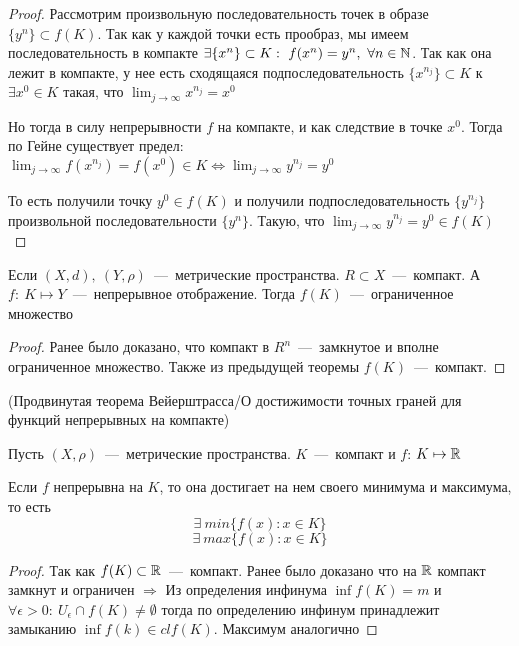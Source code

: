 \begin{proof}
    Рассмотрим произвольную последовательность точек в образе $\{y^n\} \subset f(K) $. Так как у каждой точки есть прообраз, мы имеем последовательность в компакте $\exists \{ x^n \} \subset K: \ f(x^n) = y^n, \  \forall n \in \N$. Так как она лежит в компакте, у нее есть сходящаяся  подпоследовательность $\{x^{n_{j}}\} \subset K$ к $\exists x^0 \in K$ такая, что $\lim_{j \to \infty} x^{n_{j}} = x^{0}$

    Но тогда в силу непрерывности $f$ на компакте, и как следствие в точке $x^0$. Тогда по Гейне существует предел: $\lim_{j \to \infty} f(x^{n_{j}}) = f(x^{0}) \in K \Longleftrightarrow \lim_{j \to \infty} y^{n_{j}} = y^0$

    То есть получили точку $y^0 \in f(K)$ и получили подпоследовательность $\{ y^{n_{j}} \}$ произвольной последовательности $\{ y^n \}$. Такую, что $\lim_{j \to \infty} y^{n_{j}} = y^0 \in f(K) $
    
\end{proof}


\begin{corollary}

    Если $(X, d), \ (Y, \rho)$~---~метрические пространства. $R \subset X$~---~компакт. А $f: \ K \mapsto Y$~---~непрерывное отображение. Тогда $f(K)$~---~ограниченное множество

    \begin{proof}
        Ранее было доказано, что компакт в $R^{n}$~---~замкнутое и вполне ограниченное множество. Также из предыдущей теоремы $f(K)$~---~компакт.
    \end{proof}
\end{corollary}

\begin{corollary} (Продвинутая теорема Вейерштрасса/О достижимости точных граней для функций непрерывных на компакте)

    Пусть $(X, \rho)$~---~метрические пространства. $K$~---~компакт и $f$: $K \mapsto \mathbb{R}$

    Если $f$ непрерывна на $K$, то она достигает на нем своего минимума и максимума, то есть 
    $$\exists \ min \{ f(x): x \in K \}$$
    $$\exists \ max \{ f(x): x \in K \}$$

\begin{proof}
    Так как $f(K) \subset \mathbb{R}$~---~компакт. Ранее было доказано что на $\mathbb{R}$ компакт замкнут и ограничен $\Longrightarrow$ Из определения инфинума $\inf f(K) = m$ и $\forall \epsilon > 0: \ U_{\epsilon} \cap f(K) \neq \emptyset$ тогда по определению инфинум принадлежит замыканию $\inf f(k) \in cl f(K)$. Максимум аналогично
\end{proof}
\end{corollary}
